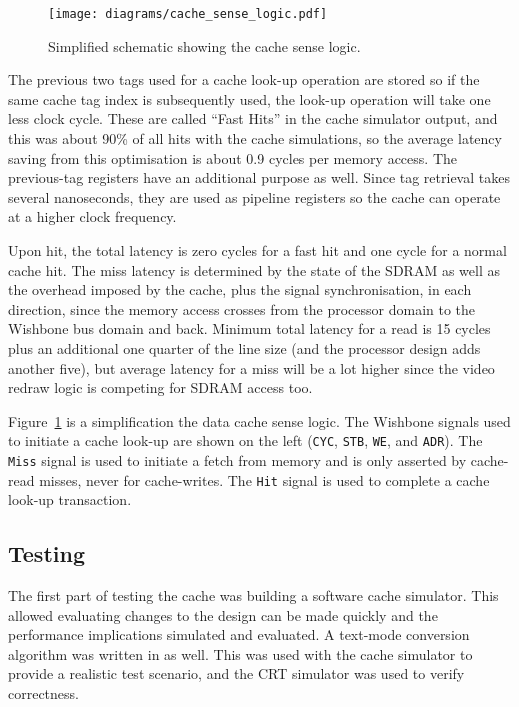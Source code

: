 \begin{figure}[h!]
\begin{center}
\texttt{[image: diagrams/cache\_sense\_logic.pdf]}
\caption[Simplified Schematic of the Cache Sense Logic]{Simplified schematic
showing the cache sense logic.}
\label{CACHE_Sense}
\end{center}
\end{figure}

The previous two tags used for a cache look-up operation are stored so if the
same cache tag index is subsequently used, the look-up operation will take one
less clock cycle. These are called ``Fast Hits'' in the cache simulator output,
and this was about 90\% of all hits with the cache simulations, so the average
latency saving from this optimisation is about 0.9 cycles per memory access. The
previous-tag registers have an additional purpose as well. Since tag retrieval
takes several nanoseconds, they are used as pipeline registers so the cache can
operate at a higher clock frequency.

Upon hit, the total latency is zero cycles for a fast hit and one cycle for a
normal cache hit. The miss latency is determined by the state of the SDRAM as
well as the overhead imposed by the cache, plus the signal synchronisation, in
each direction, since the memory access crosses from the processor domain
to the Wishbone bus domain and back. Minimum total latency for a read is 15
cycles plus an additional one quarter of the line size (and the processor
design adds another five), but average latency for a miss will be a lot higher
since the video redraw logic is competing for SDRAM access too.

Figure~\ref{CACHE_Sense} is a simplification the data cache sense logic. The
Wishbone signals used to initiate a cache look-up are shown on the left
(\texttt{CYC}, \texttt{STB}, \texttt{WE}, and \texttt{ADR}). The \texttt{Miss}
signal is used to initiate a fetch from memory and is only asserted by cache-read
misses, never for cache-writes. The \texttt{Hit} signal is used to complete a
cache look-up transaction.


\subsection{Testing}
The first part of testing the cache was building a software cache simulator. This
allowed evaluating changes to the design can be made quickly and the performance
implications simulated and evaluated. A text-mode conversion algorithm was
written in as well. This was used with the cache simulator to provide a realistic
test scenario, and the CRT simulator was used to verify correctness.

